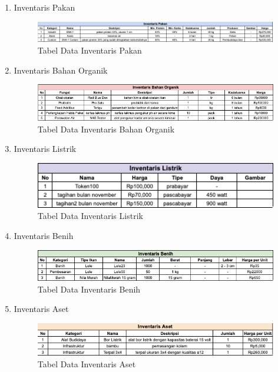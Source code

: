 \begin{enumerate}
	\item Inventaris Pakan
	
	\begin{figure}[H]
		\centering
		\includegraphics[width=1\textwidth]{gambar/tabel_inventaris_pakan.png}
		\caption{Tabel Data Inventaris Pakan}
	\end{figure}	

	\item Inventaris Bahan Organik
	
	\begin{figure}[H]
		\centering
		\includegraphics[width=1\textwidth]{gambar/tabel_inventaris_bahanorganik.png}
		\caption{Tabel Data Inventaris Bahan Organik}
	\end{figure}	

	\item Inventaris Listrik
	
	\begin{figure}[H]
		\centering
		\includegraphics[width=1\textwidth]{gambar/tabel_inventaris_listrik.png}
		\caption{Tabel Data Inventaris Listrik}
	\end{figure}	

	\item Inventaris Benih
	
	\begin{figure}[H]
		\centering
		\includegraphics[width=1\textwidth]{gambar/tabel_inventaris_benih.png}
		\caption{Tabel Data Inventaris Benih}
	\end{figure}	

	\item Inventaris Aset
	
	\begin{figure}[H]
		\centering
		\includegraphics[width=1\textwidth]{gambar/tabel_inventaris_aset.png}
		\caption{Tabel Data Inventaris Aset}
	\end{figure}	

\end{enumerate}

